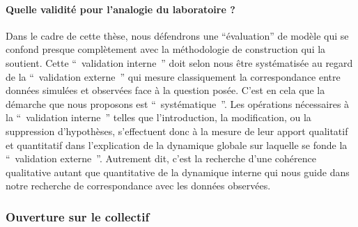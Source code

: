 
\paragraph{Quelle validité pour l'analogie du laboratoire ?}


Dans le cadre de cette thèse, nous défendrons une \enquote{évaluation} de modèle qui se confond presque complètement avec la méthodologie de construction qui la soutient. Cette \enquote{ validation interne } doit selon nous être systématisée au regard de la \enquote{ validation externe } qui mesure classiquement la correspondance entre données simulées et observées face à la question posée. C’est en cela que la démarche que nous proposons est \enquote{ systématique }. Les opérations nécessaires à la \enquote{ validation interne } telles que l'introduction, la modification, ou la suppression d'hypothèses, s’effectuent donc à la mesure de leur apport qualitatif et quantitatif dans l'explication de la dynamique globale sur laquelle se fonde la \enquote{ validation externe }. Autrement dit, c'est la recherche d'une cohérence qualitative autant que quantitative de la dynamique interne qui nous guide dans notre recherche de correspondance avec les données observées.



\subsubsection{Ouverture sur le collectif}




